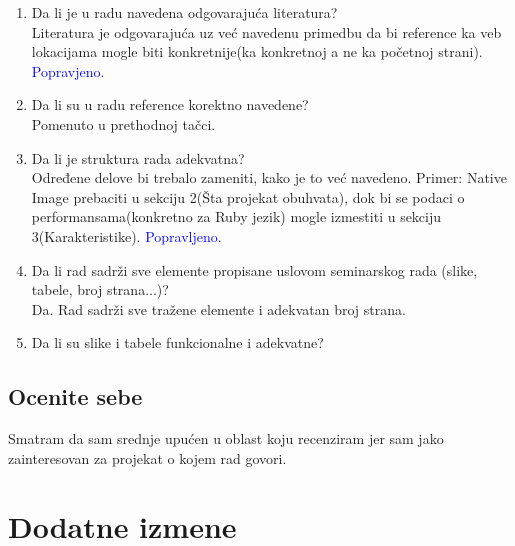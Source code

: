 \documentclass[a4paper]{report}
\newcommand{\odgovor}[1]{\textcolor{blue}{#1}}
\begin{document}
\begin{enumerate}
\item Da li je u radu navedena odgovarajuća literatura?\\
Literatura je odgovarajuća uz već navedenu primedbu da bi reference ka veb lokacijama mogle biti konkretnije(ka konkretnoj a ne ka početnoj 
strani). \odgovor{Popravjeno.}

\item Da li su u radu reference korektno navedene?\\
Pomenuto u prethodnoj tačci.

\item Da li je struktura rada adekvatna?\\
Određene delove bi trebalo zameniti, kako je to već navedeno. Primer: Native Image prebaciti u sekciju 2(Šta projekat obuhvata), dok bi se 
podaci o performansama(konkretno za Ruby jezik) mogle izmestiti u sekciju 3(Karakteristike). \odgovor{Popravljeno.}

\item Da li rad sadrži sve elemente propisane uslovom seminarskog rada (slike, tabele, broj strana...)?\\
Da. Rad sadrži sve tražene elemente i adekvatan broj strana. 

\item Da li su slike i tabele funkcionalne i adekvatne?\\


\end{enumerate}

\section{Ocenite sebe}
Smatram da sam srednje upućen u oblast koju recenziram jer sam jako zainteresovan za projekat o kojem rad govori.



\chapter{Dodatne izmene}
\end{document}
